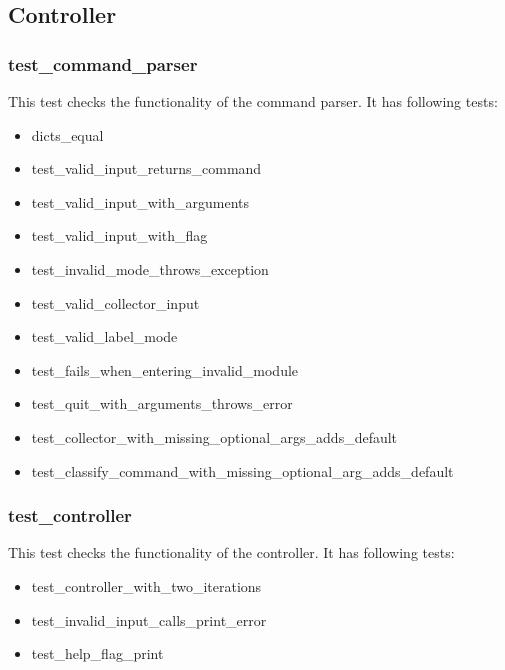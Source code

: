 \documentclass[parskip=full]{scrartcl}
\begin{document}
\subsection{Controller}
\subsubsection{test\_command\_parser}
This test checks the functionality of the command parser.
It has following tests:

\begin{itemize}

\item dicts\_equal

\item test\_valid\_input\_returns\_command

\item test\_valid\_input\_with\_arguments

\item test\_valid\_input\_with\_flag

\item test\_invalid\_mode\_throws\_exception

\item test\_valid\_collector\_input

\item test\_valid\_label\_mode

\item test\_fails\_when\_entering\_invalid\_module

\item test\_quit\_with\_arguments\_throws\_error

\item test\_collector\_with\_missing\_optional\_args\_adds\_default

\item test\_classify\_command\_with\_missing\_optional\_arg\_adds\_default

\end{itemize}

\subsubsection{test\_controller}
This test checks the functionality of the controller.
It has following tests:

\begin{itemize}

\item test\_controller\_with\_two\_iterations

\item test\_invalid\_input\_calls\_print\_error

\item test\_help\_flag\_print

\end{itemize}
\end{document}
